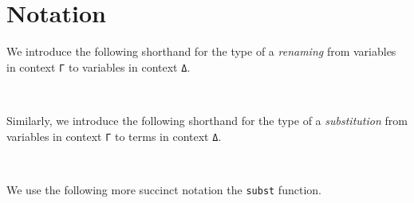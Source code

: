 \hypertarget{notation}{%
\section{Notation}\label{notation}}

We introduce the following shorthand for the type of a \emph{renaming}
from variables in context \texttt{Γ} to variables in context \texttt{Δ}.

\begin{fence}
\begin{code}%
\>[0]\AgdaSpace{}%
\AgdaSymbol{:}\AgdaSpace{}%
\AgdaSpace{}%
\AgdaSpace{}%
\AgdaSpace{}%
\AgdaSpace{}%
\<%
\\
\>[0]\AgdaSpace{}%
\AgdaSpace{}%
\AgdaSpace{}%
\AgdaSymbol{=}\AgdaSpace{}%
\AgdaSymbol{\}}\AgdaSpace{}%
\AgdaSpace{}%
\AgdaSpace{}%
\AgdaSpace{}%
\AgdaSpace{}%
\AgdaSpace{}%
\AgdaSpace{}%
\AgdaSpace{}%
\<%
\end{code}
\end{fence}

Similarly, we introduce the following shorthand for the type of a
\emph{substitution} from variables in context \texttt{Γ} to terms in
context \texttt{Δ}.

\begin{fence}
\begin{code}%
\>[0]\AgdaSpace{}%
\AgdaSymbol{:}\AgdaSpace{}%
\AgdaSpace{}%
\AgdaSpace{}%
\AgdaSpace{}%
\AgdaSpace{}%
\<%
\\
\>[0]\AgdaSpace{}%
\AgdaSpace{}%
\AgdaSpace{}%
\AgdaSymbol{=}\AgdaSpace{}%
\AgdaSymbol{\}}\AgdaSpace{}%
\AgdaSpace{}%
\AgdaSpace{}%
\AgdaSpace{}%
\AgdaSpace{}%
\AgdaSpace{}%
\AgdaSpace{}%
\AgdaSpace{}%
\<%
\end{code}
\end{fence}

We use the following more succinct notation the \texttt{subst} function.

